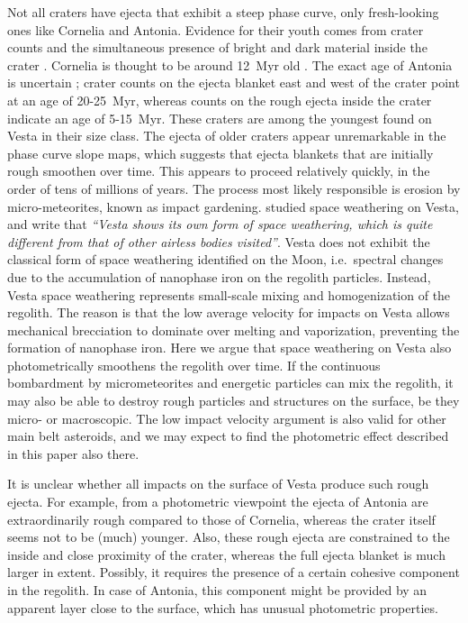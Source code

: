 \documentclass[3p,authoryear]{elsarticle}
\begin{document}
Not all craters have ejecta that exhibit a steep phase curve, only fresh-looking ones like Cornelia and Antonia. Evidence for their youth comes from crater counts \citep{K14,KJ14} and the simultaneous presence of bright and dark material inside the crater \citep{P12}. Cornelia is thought to be around 12~Myr old \citep{KJ14}. The exact age of Antonia is uncertain \citep{K14}; crater counts on the ejecta blanket east and west of the crater point at an age of 20-25~Myr, whereas counts on the rough ejecta inside the crater indicate an age of 5-15~Myr. These craters are among the youngest found on Vesta in their size class. The ejecta of older craters appear unremarkable in the phase curve slope maps, which suggests that ejecta blankets that are initially rough smoothen over time. This appears to proceed relatively quickly, in the order of tens of millions of years. The process most likely responsible is erosion by micro-meteorites, known as impact gardening. \citet{P12} studied space weathering on Vesta, and write that {\it ``Vesta shows its own form of space weathering, which is quite different from that of other airless bodies visited''}. Vesta does not exhibit the classical form of space weathering identified on the Moon, i.e.\ spectral changes due to the accumulation of nanophase iron on the regolith particles. Instead, Vesta space weathering represents small-scale mixing and homogenization of the regolith. The reason is that the low average velocity for impacts on Vesta allows mechanical brecciation to dominate over melting and vaporization, preventing the formation of nanophase iron. Here we argue that space weathering on Vesta also photometrically smoothens the regolith over time. If the continuous bombardment by micrometeorites and energetic particles can mix the regolith, it may also be able to destroy rough particles and structures on the surface, be they micro- or macroscopic. The low impact velocity argument is also valid for other main belt asteroids, and we may expect to find the photometric effect described in this paper also there.

It is unclear whether all impacts on the surface of Vesta produce such rough ejecta. For example, from a photometric viewpoint the ejecta of Antonia are extraordinarily rough compared to those of Cornelia, whereas the crater itself seems not to be (much) younger. Also, these rough ejecta are constrained to the inside and close proximity of the crater, whereas the full ejecta blanket is much larger in extent. Possibly, it requires the presence of a certain cohesive component in the regolith. In case of Antonia, this component might be provided by an apparent layer close to the surface, which has unusual photometric properties.
\end{document}
